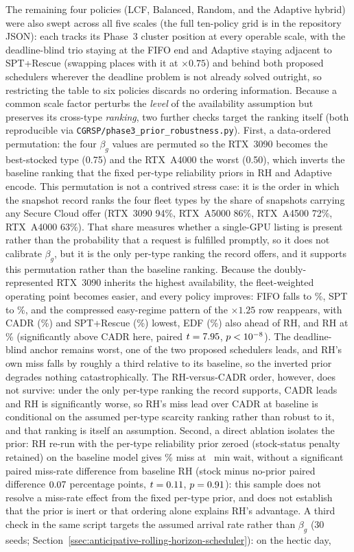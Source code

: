 {The remaining four policies (LCF, Balanced, Random, and the Adaptive hybrid) were also swept across all five scales (the full ten-policy grid is in the repository JSON): each tracks its Phase~3 cluster position at every operable scale, with the deadline-blind trio staying at the FIFO end and Adaptive staying adjacent to SPT+Rescue (swapping places with it at $\times 0.75$) and behind both proposed schedulers wherever the deadline problem is not already solved outright, so restricting the table to six policies discards no ordering information. Because a common scale factor perturbs the \emph{level} of the availability assumption but preserves its cross-type \emph{ranking}, two further checks target the ranking itself (both reproducible via \texttt{CGRSP/phase3\_prior\_robustness.py}). First, a data-ordered permutation: the four $\beta_g$ values are permuted so the RTX~3090 becomes the best-stocked type (0.75) and the RTX~A4000 the worst (0.50), which inverts the baseline ranking that the fixed per-type reliability priors in RH and Adaptive encode. This permutation is not a contrived stress case: it is the order in which the snapshot record ranks the four fleet types by the share of snapshots carrying any Secure Cloud offer (RTX~3090 94\%, RTX~A5000 86\%, RTX~A4500 72\%, RTX~A4000 63\%). That share measures whether a single-GPU listing is present rather than the probability that a request is fulfilled promptly, so it does not calibrate $\beta_g$, but it is the only per-type ranking the record offers, and it supports this permutation rather than the baseline ranking. Because the doubly-represented RTX~3090 inherits the highest availability, the fleet-weighted operating point becomes easier, and every policy improves: FIFO falls to \RevFIFOmiss\%, SPT to \RevSPTmiss\%, and the compressed easy-regime pattern of the $\times 1.25$ row reappears, with CADR (\RevCADRmiss\%) and SPT+Rescue (\RevRescueMiss\%) lowest, EDF (\RevEDFmiss\%) also ahead of RH, and RH at \RevRHmiss\% (significantly above CADR here, paired $t=7.95$, $p<10^{-8}$). The deadline-blind anchor remains worst, one of the two proposed schedulers leads, and RH's own miss falls by roughly a third relative to its baseline, so the inverted prior degrades nothing catastrophically. The RH-versus-CADR order, however, does not survive: under the only per-type ranking the record supports, CADR leads and RH is significantly worse, so RH's miss lead over CADR at baseline is conditional on the assumed per-type scarcity ranking rather than robust to it, and that ranking is itself an assumption. Second, a direct ablation isolates the prior: RH re-run with the per-type reliability prior zeroed (stock-status penalty retained) on the baseline model gives \NoPriorRHmiss\% miss at \NoPriorRHwait~min wait, without a significant paired miss-rate difference from baseline RH (stock minus no-prior paired difference $0.07$ percentage points, $t=0.11$, $p=0.91$): this sample does not resolve a miss-rate effect from the fixed per-type prior, and does not establish that the prior is inert or that ordering alone explains RH's advantage. A third check in the same script targets the assumed arrival rate rather than $\beta_g$ (30 seeds; Section~\ref{ssec:anticipative-rolling-horizon-scheduler}): on the hectic day, }
